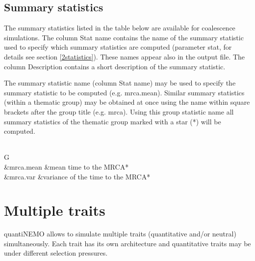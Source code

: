 \documentclass[letterpaper,12pt,oneside]{book}
\begin{document}
\begin{description}
\end{description}

\section{Summary statistics}\label{ssCoal}
The summary statistics listed in the table below are available for coalescence simulations. The column \textsf{Stat name} contains the name of the summary statistic used to specify which summary statistics are computed (parameter \textsf{stat}, for details see section \ref{2statistics}). These names appear also in the output file. The column \textsf{Description} contains a short description of the summary statistic. 

The summary statistic name (column \textsf{Stat name}) may be used to specify the summary statistic to be computed (e.g. \textsf{mrca.mean}). Similar summary statistics (within a thematic group) may be obtained at once using the name within square brackets after the group title (e.g. \textsf{mrca}). Using this group statistic name all summary statistics of the thematic group marked with a star (*) will be computed. 
\\
\\

\begin{supertabular}{G}
\\
 &mrca.mean			&mean time to the MRCA*\\
 &mrca.var			&variance of the time to the MRCA* \\
\end{supertabular}




\chapter{Multiple traits}\label{chap:quantiMulti}
quantiNEMO allows to simulate multiple traits (quantitative and/or neutral) simultaneously. Each trait has its own architecture and quantitative traits may be under different selection pressures.
\end{document}
